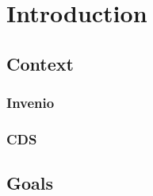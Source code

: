 \chapter{Introduction}


\section{Context}

\subsection{Invenio}
\subsection{CDS}

\section{Goals}



















